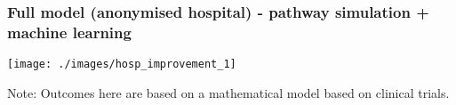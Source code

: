 \begin{frame}
\frametitle{Full model (anonymised hospital) - pathway simulation + machine learning}

\begin{center}
\texttt{[image: ./images/hosp\_improvement\_1]}
\end{center}

Note: Outcomes here are based on a mathematical model based on clinical trials.

\end{frame}
